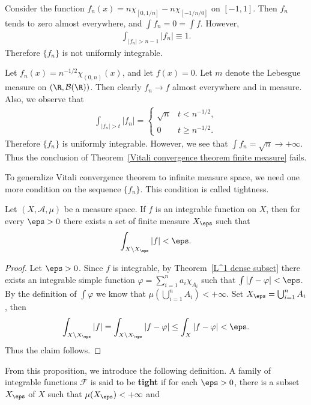 \begin{example}
Consider the function $f_n(x)=n\chi_{{[0,1/n]}}-n\chi_{[-1/n/0]}$ on $[-1,1]$. Then $f_n$ tends to zero almost everywhere, and $\int f_n=0=\int f$. However,
\begin{align*}
\int_{|f_n|>n-1}|f_n|\equiv 1.
\end{align*}
Therefore $\{f_n\}$ is not uniformly integrable.
\end{example}
\begin{example}
Let $f_n(x)=n^{-1/2}\chi_{(0,n)}(x)$, and let $f(x)=0$. Let $m$ denote the Lebesgue measure on $(\R,\mathcal{B}(\R))$. Then clearly $f_n\to f$ almost everywhere and in measure. Also, we observe that
\begin{align*}
\int_{|f_n|>t}|f_n|=\begin{cases}
\sqrt{n}&t<n^{-1/2},\\
0&t\geq n^{-1/2}.
\end{cases}
\end{align*}
Therefore $\{f_n\}$ is uniformly integrable. However, we see that $\int f_n=\sqrt{n}\to+\infty$. Thus the conclusion of Theorem~\ref{Vitali convergence theorem finite measure} fails.
\end{example}
To generalize Vitali convergence theorem to infinite measure space, we need one more condition on the sequence $\{f_n\}$. This condition is called tightness.
\begin{proposition}
Let $(X,\mathcal{A},\mu)$ be a measure space. If $f$ is an integrable function on $X$, then for every $\eps>0$ there exists a set of finite measure $X_{\eps}$ such that
\begin{align}\label{integrable function tightness}
\int_{X\setminus X_\eps}|f|<\eps.
\end{align}
\end{proposition}
\begin{proof}
Let $\eps>0$. Since $f$ is integrable, by Theorem~\ref{L^1 dense subset} there exists an integrable simple function $\varphi=\sum_{i=1}^{n}a_i\chi_{A_i}$ such that $\int|f-\varphi|<\eps$. By the definition of $\int\varphi$ we know that $\mu(\bigcup_{i=1}^{n}A_i)<+\infty$. Set $X_\eps=\bigcup_{i=1}^{n}A_i$, then
\[\int_{X\setminus X_\eps}|f|=\int_{X\setminus X_\eps}|f-\varphi|\leq\int_{X}|f-\varphi|<\eps.\]
Thus the claim follows.  
\end{proof}
From this proposition, we introduce the following definition. A family of integrable functions $\mathscr{F}$ is said to be \textbf{tight} if for each $\eps>0$, there is a subset $X_\eps$ of $X$ such that $\mu(X_\eps)<+\infty$ and
